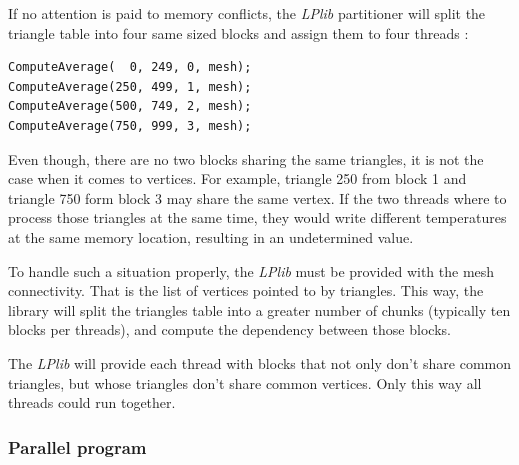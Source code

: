 \documentclass[a4paper,12pt]{article}
\begin{document}
If no attention is paid to memory conflicts, the \emph{LPlib} partitioner will split the triangle table into four same sized blocks and assign them to four threads :

\begin{tt}
\begin{verbatim}
ComputeAverage(  0, 249, 0, mesh);
ComputeAverage(250, 499, 1, mesh);
ComputeAverage(500, 749, 2, mesh);
ComputeAverage(750, 999, 3, mesh);
\end{verbatim}
\end{tt}
\normalfont

Even though, there are no two blocks sharing the same triangles, it is not the case when it comes to vertices. For example, triangle 250 from block 1 and triangle 750 form block 3 may share the same vertex. If the two threads where to process those triangles at the same time, they would write different temperatures at the same memory location, resulting in an undetermined value.

To handle such a situation properly, the \emph{LPlib} must be provided with the mesh connectivity. That is the list of vertices pointed to by triangles. This way, the library will split the triangles table into a greater number of chunks (typically ten blocks per threads), and compute the dependency between those blocks.

The \emph{LPlib} will provide each thread with blocks that not only don't share common triangles, but whose triangles don't share common vertices. Only this way all threads could run together.

\subsubsection{Parallel program}
\end{document}
